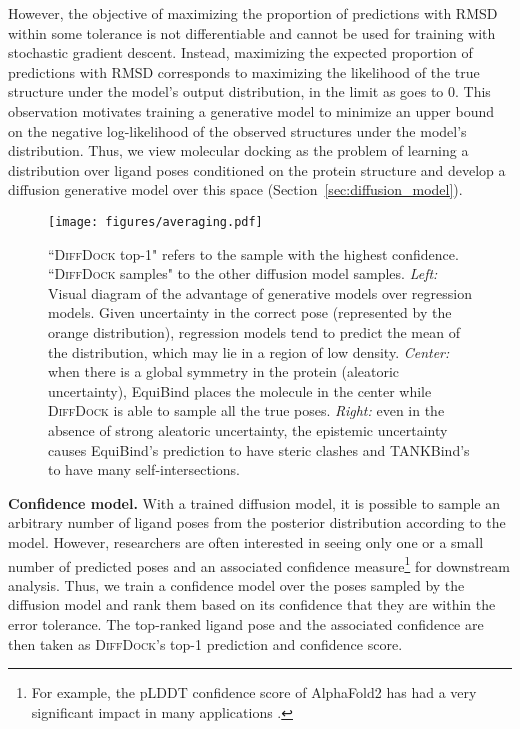 \documentclass{article} \usepackage{iclr2023_conference,times}
\begin{document}
However, the objective of maximizing the proportion of predictions with RMSD within some tolerance  is not differentiable and cannot be used for training with stochastic gradient descent. Instead, maximizing the expected proportion of predictions with RMSD  corresponds to maximizing the likelihood of the true structure under the model's output distribution, in the limit as  goes to 0. This observation motivates training a generative model to minimize an upper bound on the negative log-likelihood of the observed structures under the model's distribution. Thus, we view molecular docking as the problem of learning a distribution over ligand poses conditioned on the protein structure and develop a diffusion generative model over this space (Section~\ref{sec:diffusion_model}).

\begin{figure}[t]
    \centering
    \texttt{[image: figures/averaging.pdf]}
    \caption{``\textsc{DiffDock} top-1" refers to the sample with the highest confidence. ``\textsc{DiffDock} samples" to the other diffusion model samples. \textit{Left:} Visual diagram of the advantage of generative models over regression models. Given uncertainty in the correct pose (represented by the orange distribution), regression models tend to predict the mean of the distribution, which may lie in a region of low density. \textit{Center:} when there is a global symmetry in the protein (aleatoric uncertainty), EquiBind places the molecule in the center while \textsc{DiffDock} is able to sample all the true poses. \textit{Right:} even in the absence of strong aleatoric uncertainty, the epistemic uncertainty causes EquiBind's prediction to have steric clashes and TANKBind's to have many self-intersections. }
    \label{fig:averaging}
\end{figure}

\textbf{Confidence model.} With a trained diffusion model, it is possible to sample an arbitrary number of ligand poses from the posterior distribution according to the model. However, researchers are often interested in seeing only one or a small number of predicted poses and an associated confidence measure\footnote{For example, the pLDDT confidence score of AlphaFold2 \citep{jumper2021highly} has had a very significant impact in many applications \citep{necci2021critical,bennett2022improving}.} for downstream analysis. Thus, we train a confidence model over the poses sampled by the diffusion model and rank them based on its confidence that they are within the error tolerance. The top-ranked ligand pose and the associated confidence are then taken as \textsc{DiffDock}'s top-1 prediction and confidence score.
\end{document}
